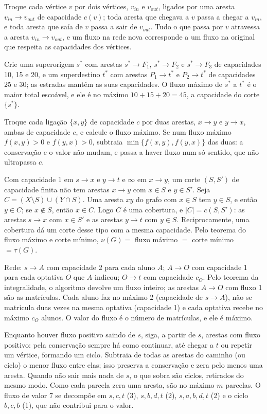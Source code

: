  Troque cada vértice $v$ por dois vértices, $v_{in}$ e $v_{out}$, ligados por uma aresta $v_{in}\to v_{out}$ de capacidade $c(v)$; toda aresta que chegava a $v$ passa a chegar a $v_{in}$, e toda aresta que saía de $v$ passa a sair de $v_{out}$. Tudo o que passa por $v$ atravessa a aresta $v_{in}\to v_{out}$, e um fluxo na rede nova corresponde a um fluxo na original que respeita as capacidades dos vértices.

 Crie uma superorigem $s^*$ com arestas $s^*\to F_1$, $s^*\to F_2$ e $s^*\to F_3$ de capacidades 10, 15 e 20, e um superdestino $t^*$ com arestas $P_1\to t^*$ e $P_2\to t^*$ de capacidades 25 e 30; as estradas mantêm as suas capacidades. O fluxo máximo de $s^*$ a $t^*$ é o maior total escoável, e ele é no máximo $10+15+20=45$, a capacidade do corte $\{s^*\}$.

 Troque cada ligação $\{x,y\}$ de capacidade $c$ por duas arestas, $x\to y$ e $y\to x$, ambas de capacidade $c$, e calcule o fluxo máximo. Se num fluxo máximo $f(x,y)>0$ e $f(y,x)>0$, subtraia $\min\{f(x,y),f(y,x)\}$ das duas: a conservação e o valor não mudam, e passa a haver fluxo num só sentido, que não ultrapassa $c$.

 Com capacidade 1 em $s\to x$ e $y\to t$ e $\infty$ em $x\to y$, um corte $(S,S')$ de capacidade finita não tem arestas $x\to y$ com $x\in S$ e $y\in S'$. Seja $C=(X\setminus S)\cup(Y\cap S)$. Uma aresta $xy$ do grafo com $x\in S$ tem $y\in S$, e então $y\in C$; se $x\notin S$, então $x\in C$. Logo $C$ é uma cobertura, e $|C|=c(S,S')$: as arestas $s\to x$ com $x\in S'$ e as arestas $y\to t$ com $y\in S$. Reciprocamente, uma cobertura dá um corte desse tipo com a mesma capacidade. Pelo teorema do fluxo máximo e corte mínimo, $\nu(G)=$ fluxo máximo $=$ corte mínimo $=\tau(G)$.

 Rede: $s\to A$ com capacidade 2 para cada aluno $A$; $A\to O$ com capacidade 1 para cada optativa $O$ que $A$ indicou; $O\to t$ com capacidade $c_O$. Pelo teorema da integralidade, o algoritmo devolve um fluxo inteiro; as arestas $A\to O$ com fluxo 1 são as matrículas. Cada aluno faz no máximo 2 (capacidade de $s\to A$), não se matricula duas vezes na mesma optativa (capacidade 1) e cada optativa recebe no máximo $c_O$ alunos. O valor do fluxo é o número de matrículas, e ele é máximo.

 Enquanto houver fluxo positivo saindo de $s$, siga, a partir de $s$, arestas com fluxo positivo: pela conservação sempre há como continuar, até chegar a $t$ ou repetir um vértice, formando um ciclo. Subtraia de todas as arestas do caminho (ou ciclo) o menor fluxo entre elas; isso preserva a conservação e zera pelo menos uma aresta. Quando não sair mais nada de $s$, o que sobra são ciclos, retirados do mesmo modo. Como cada parcela zera uma aresta, são no máximo $m$ parcelas. O fluxo de valor 7 se decompõe em $s,c,t$ (3), $s,b,d,t$ (2), $s,a,b,d,t$ (2) e o ciclo $b,c,b$ (1), que não contribui para o valor.

